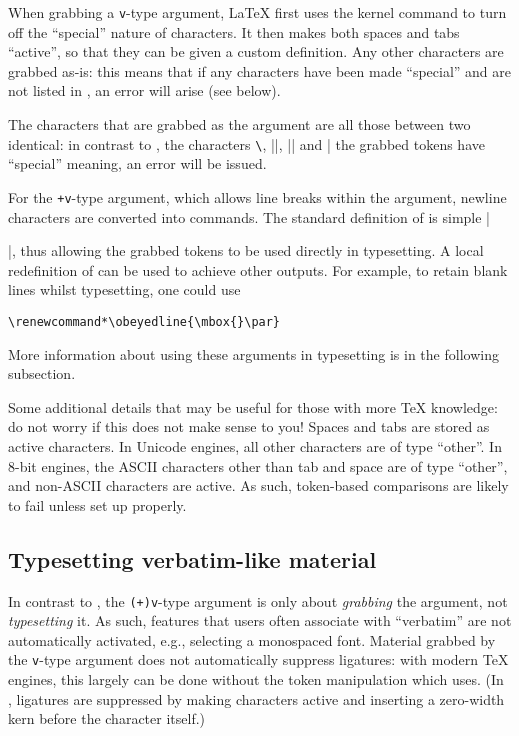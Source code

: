 \documentclass{ltxguide}
\begin{document}
When grabbing a \texttt{v}-type argument, \LaTeX{} first uses the kernel
command  to turn off the \enquote{special} nature of characters.
It then makes both spaces and tabs \enquote{active}, so that they can be given
a custom definition. Any other characters are grabbed as-is: this means that if
any characters have been made \enquote{special} and are not listed in
, an error will arise (see below).

The characters that are grabbed as the argument are all those between two
identical: in contrast to , the characters \texttt{\textbackslash},
|{|, |}| and |%
the grabbed tokens have \enquote{special} meaning, an error will be issued.

For the \texttt{+v}-type argument, which allows line breaks within the
argument, newline characters are converted into  commands. The
standard definition of  is simple |\par|, thus allowing the
grabbed tokens to be used directly in typesetting. A local redefinition of
 can be used to achieve other outputs. For example, to retain
blank lines whilst typesetting, one could use
\begin{verbatim}
\renewcommand*\obeyedline{\mbox{}\par}
\end{verbatim}
More information about using these arguments in typesetting is in the following
subsection.

Some additional details that may be useful for those with more \TeX{}
knowledge: do not worry if this does not make sense to you! Spaces and tabs are
stored as active characters. In Unicode engines, all other characters are of
type \enquote{other}. In $8$-bit engines, the ASCII characters other than tab
and space are of type \enquote{other}, and non-ASCII characters are active. As
such, token-based comparisons are likely to fail unless set up properly.

\subsection{Typesetting verbatim-like material}

In contrast to , the \texttt{(+)v}-type argument is only about
\emph{grabbing} the argument, not \emph{typesetting} it. As such, features that
users often associate with \enquote{verbatim} are not automatically activated,
e.g., selecting a monospaced font. Material grabbed by the \texttt{v}-type
argument does not automatically suppress ligatures: with modern \TeX{} engines,
this largely can be done without the token manipulation which  uses.
(In , ligatures are suppressed by making characters active and
inserting a zero-width kern before the character itself.)
\end{document}
